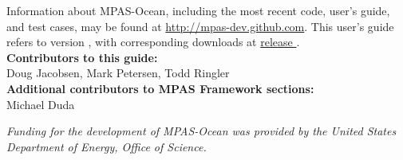 
Information about MPAS-Ocean, including the most recent code, user's guide, and test cases, may be found at \url{http://mpas-dev.github.com}.  This user's guide refers to version \version, with corresponding downloads at \href{http://mpas-dev.github.com/ocean/release_\version/release_\version.html}{release \version}. \\

\vspace{8pt}
\noindent
{\bf Contributors to this guide:}\\
Doug Jacobsen, Mark Petersen, Todd Ringler\\
{\bf Additional contributors to MPAS Framework sections:}\\
Michael Duda

\vspace{8pt}
\noindent
{\it Funding for the development of MPAS-Ocean was provided by the United States Department of Energy, Office of Science.}




